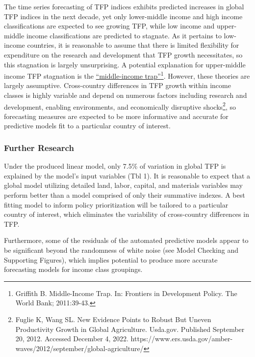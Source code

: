 \documentclass[
  letterpaper,
  DIV=11,
  numbers=noendperiod]{scrartcl}
\begin{document}
The time series forecasting of TFP indices exhibits predicted increases
in global TFP indices in the next decade, yet only lower-middle income
and high income classifications are expected to see growing TFP, while
low income and upper-middle income classifications are predicted to
stagnate. As it pertains to low-income countries, it is reasonable to
assume that there is limited flexibility for expenditure on the research
and development that TFP growth necessitates, so this stagnation is
largely unsurprising. A potential explanation for upper-middle income
TFP stagnation is the
\href{https://elibrary.worldbank.org/doi/10.1596/9780821387856_CH04}{``middle-income
trap''}\footnote{Griffith B. Middle-Income Trap. In: Frontiers in
  Development Policy. The World Bank; 2011:39-43.}. However, these
theories are largely assumptive. Cross-country differences in TFP growth
within income classes is highly variable and depend on numerous factors
including research and development, enabling environments, and
economically disruptive shocks\footnote{Fuglie K, Wang SL. New Evidence
  Points to Robust But Uneven Productivity Growth in Global Agriculture.
  Usda.gov. Published September 20, 2012. Accessed December 4, 2022.
  https://www.ers.usda.gov/amber-waves/2012/september/global-agriculture/},
so forecasting measures are expected to be more informative and accurate
for predictive models fit to a particular country of interest.

\hypertarget{further-research}{%
\subsubsection{Further Research}\label{further-research}}

Under the produced linear model, only 7.5\% of variation in global TFP
is explained by the model's input variables (Tbl 1). It is reasonable to
expect that a global model utilizing detailed land, labor, capital, and
materials variables may perform better than a model comprised of only
their summative indexes. A best fitting model to inform policy
prioritization will be tailored to a particular country of interest,
which eliminates the variability of cross-country differences in TFP.

Furthermore, some of the residuals of the automated predictive models
appear to be significant beyond the randomness of white noise (see Model
Checking and Supporting Figures), which implies potential to produce
more accurate forecasting models for income class groupings.
\end{document}
